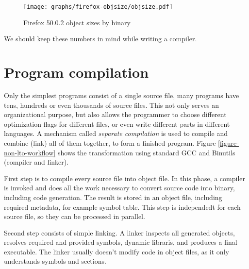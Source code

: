 \begin{figure}[h!]
\label{figure-firefox-objsize}
\centering
\texttt{[image: graphs/firefox-objsize/objsize.pdf]}
\caption{Firefox 50.0.2 object sizes by binary}
\end{figure}

We should keep these numbers in mind while writing a compiler.

\section{Program compilation}

Only the simplest programs consist of a single source file, many programs have
tens, hundreds or even thousands of source files. This not only serves an
organizational purpose, but also allows the programmer to choose different
optimization flags for different files, or even write different parts in
different languages. A mechanism called {\sl separate compilation} is used to
compile and combine (link) all of them together, to form a finished program.
Figure \ref{figure-non-lto-workflow} shows the transformation using standard GCC
and Binutils (compiler and linker).

First step is to compile every  source file into object file. In this phase, a
compiler is invoked and does all the work necessary to convert source code into
binary, including code generation. The result is stored in an object file,
including required metadata, for example symbol table. This step is independedt
for each source file, so they can be processed in parallel. 

Second step consists of simple linking. A linker inspects all generated objects,
resolves required and provided symbols, dynamic libraris, and produces a
final executable. The linker usually doesn't modify code in object files, as it
only understands symbols and sections.

